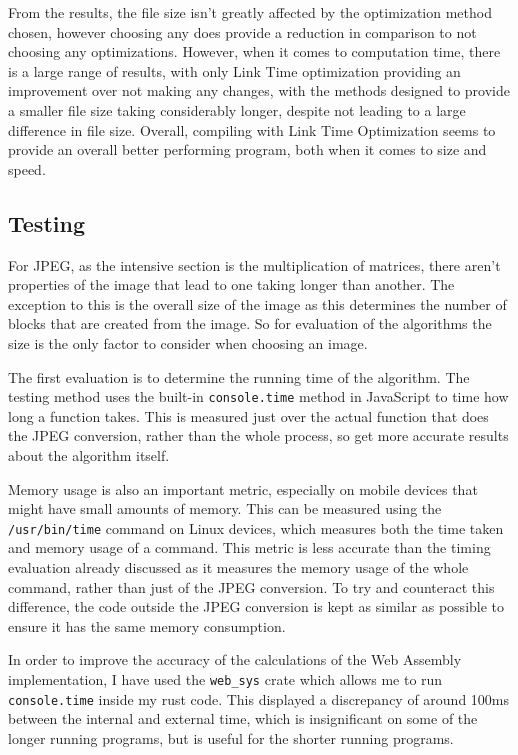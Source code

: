 \documentclass[12pt,a4paper]{article}
\begin{document}
From the results, the file size isn't greatly affected by the optimization method chosen, however choosing any does provide a reduction in comparison to not choosing any optimizations. However, when it comes to computation time, there is a large range of results, with only Link Time optimization providing an improvement over not making any changes, with the methods designed to provide a smaller file size taking considerably longer, despite not leading to a large difference in file size. Overall, compiling with Link Time Optimization seems to provide an overall better performing program, both when it comes to size and speed.



\subsection{Testing}

For JPEG, as the intensive section is the multiplication of matrices, there aren't properties of the image that lead to one taking longer than another. The exception to this is the overall size of the image as this determines the number of blocks that are created from the image. So for evaluation of the algorithms the size is the only factor to consider when choosing an image.

The first evaluation is to determine the running time of the algorithm. The testing method uses the built-in \texttt{console.time} method in JavaScript to time how long a function takes. This is measured just over the actual function that does the JPEG conversion, rather than the whole process, so get more accurate results about the algorithm itself.

Memory usage is also an important metric, especially on mobile devices that might have small amounts of memory. This can be measured using the \texttt{/usr/bin/time} command on Linux devices, which measures both the time taken and memory usage of a command. This metric is less accurate than the timing evaluation already discussed as it measures the memory usage of the whole command, rather than just of the JPEG conversion. To try and counteract this difference, the code outside the JPEG conversion is kept as similar as possible to ensure it has the same memory consumption.

In order to improve the accuracy of the calculations of the Web Assembly implementation, I have used the \texttt{web\_sys} crate which allows me to run \texttt{console.time} inside my rust code. This displayed a discrepancy of around 100ms between the internal and external time, which is insignificant on some of the longer running programs, but is useful for the shorter running programs.
\end{document}
